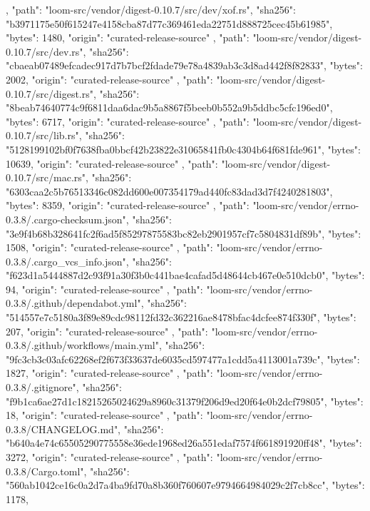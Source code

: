 {{    },
    {
      "path": "loom-src/vendor/digest-0.10.7/src/dev/xof.rs",
      "sha256": "b3971175e50f615247e4158cba87d77c369461eda22751d888725cec45b61985",
      "bytes": 1480,
      "origin": "curated-release-source"
    },
    {
      "path": "loom-src/vendor/digest-0.10.7/src/dev.rs",
      "sha256": "cbaeab07489efcadec917d7b7bcf2fdade79e78a4839ab3c3d8ad442f8f82833",
      "bytes": 2002,
      "origin": "curated-release-source"
    },
    {
      "path": "loom-src/vendor/digest-0.10.7/src/digest.rs",
      "sha256": "8beab74640774c9f6811daa6dac9b5a8867f5beeb0b552a9b5ddbc5cfc196ed0",
      "bytes": 6717,
      "origin": "curated-release-source"
    },
    {
      "path": "loom-src/vendor/digest-0.10.7/src/lib.rs",
      "sha256": "5128199102bf0f7638fba0bbcf42b23822e31065841fb0c4304b64f681fde961",
      "bytes": 10639,
      "origin": "curated-release-source"
    },
    {
      "path": "loom-src/vendor/digest-0.10.7/src/mac.rs",
      "sha256": "6303caa2c5b76513346c082dd600e007354179ad440fc83dad3d7f4240281803",
      "bytes": 8359,
      "origin": "curated-release-source"
    },
    {
      "path": "loom-src/vendor/errno-0.3.8/.cargo-checksum.json",
      "sha256": "3e9f4b68b328641fc2f6ad5f85297875583bc82eb2901957cf7c5804831df89b",
      "bytes": 1508,
      "origin": "curated-release-source"
    },
    {
      "path": "loom-src/vendor/errno-0.3.8/.cargo_vcs_info.json",
      "sha256": "f623d1a5444887d2c93f91a30f3b0c441bae4cafad5d48644cb467e0e510dcb0",
      "bytes": 94,
      "origin": "curated-release-source"
    },
    {
      "path": "loom-src/vendor/errno-0.3.8/.github/dependabot.yml",
      "sha256": "514557e7c5180a3f89e89cdc98112fd32c362216ae8478bfac4dcfee874f330f",
      "bytes": 207,
      "origin": "curated-release-source"
    },
    {
      "path": "loom-src/vendor/errno-0.3.8/.github/workflows/main.yml",
      "sha256": "9fc3cb3c03afc62268ef2f673f33637de6035cd597477a1cdd5a4113001a739c",
      "bytes": 1827,
      "origin": "curated-release-source"
    },
    {
      "path": "loom-src/vendor/errno-0.3.8/.gitignore",
      "sha256": "f9b1ca6ae27d1c18215265024629a8960c31379f206d9ed20f64e0b2dcf79805",
      "bytes": 18,
      "origin": "curated-release-source"
    },
    {
      "path": "loom-src/vendor/errno-0.3.8/CHANGELOG.md",
      "sha256": "b640a4e74c65505290775558e36ede1968ed26a551edaf7574f661891920ff48",
      "bytes": 3272,
      "origin": "curated-release-source"
    },
    {
      "path": "loom-src/vendor/errno-0.3.8/Cargo.toml",
      "sha256": "560ab1042ce16c0a2d7a4ba9fd70a8b360f760607e9794664984029c2f7cb8cc",
      "bytes": 1178,
}}
